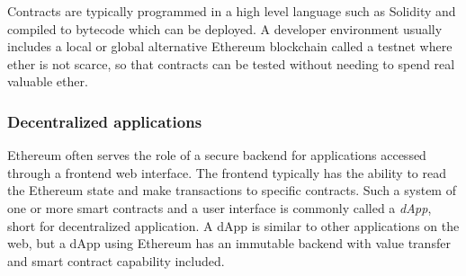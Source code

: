 Contracts are typically programmed in a high level language such as Solidity and compiled to bytecode which can be deployed. A developer environment usually includes a local or global alternative Ethereum blockchain called a testnet where ether is not scarce, so that contracts can be tested without needing to spend real valuable ether.

\subsubsection{Decentralized applications}
Ethereum often serves the role of a secure backend for applications accessed through a frontend web interface. The frontend typically has the ability to read the Ethereum state and make transactions to specific contracts. Such a system of one or more smart contracts and a user interface is commonly called a \emph{dApp}, short for decentralized application. A dApp is similar to other applications on the web, but a dApp using Ethereum has an immutable backend with value transfer and smart contract capability included.
